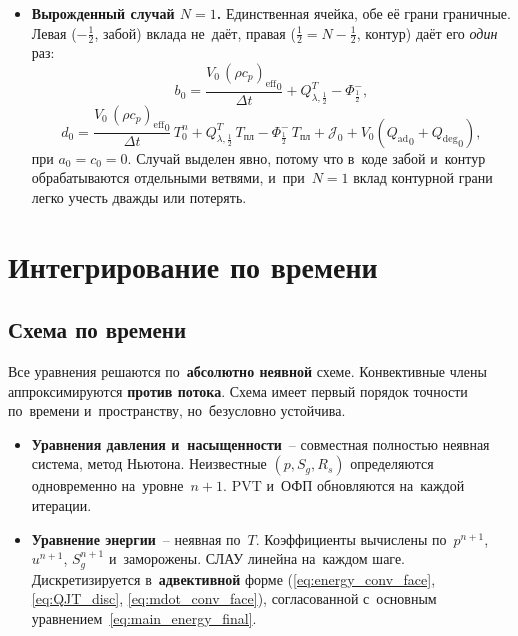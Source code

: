 \documentclass[12pt,a4paper]{article}
\newcommand{\half}{\tfrac{1}{2}}
\newcommand{\pwf}{p_{\mathrm{wf}}}
\newcommand{\Tpl}{T_{\text{пл}}}
\newcommand{\rhocpeff}{(\rho c_p)_{\mathrm{eff}}}
\newcommand{\Qad}{Q_{\mathrm{ad}}}
\newcommand{\Qdeg}{Q_{\mathrm{deg}}}
\begin{document}
\begin{itemize}[nosep]
    \textbf{Важно.} При \emph{втекании} через забой ($\Phi_{-\half}^{+} > 0$,
    то~есть $\pwf > p_0$) температура входящего потока не~задана
    ни~одним условием, и~формула выше её не~восполняет. Такой режим
    для~данной постановки не~определён и~должен запрещаться
    проверкой в~реализации.
  \item \textbf{Вырожденный случай $N = 1$.} Единственная ячейка,
    обе её грани граничные. Левая ($-\half$, забой) вклада не~даёт, правая
    ($\half = N-\half$, контур) даёт его \emph{один} раз:
    \[
      b_0 = \frac{V_0\,{\rhocpeff}_0}{\Delta t}
            + Q_{\lambda,\half}^T - \Phi_{\half}^{-},
      \]
      \[
      d_0 = \frac{V_0\,{\rhocpeff}_0}{\Delta t}\,T_0^n
            + Q_{\lambda,\half}^T\,\Tpl
            - \Phi_{\half}^{-}\,\Tpl
            + \mathcal{J}_0 + V_0({\Qad}_0 + {\Qdeg}_0),
    \]
    при $a_0 = c_0 = 0$. Случай выделен явно, потому что в~коде
    забой и~контур обрабатываются отдельными ветвями, и~при~$N = 1$
    вклад контурной грани легко учесть дважды или потерять.
\end{itemize}


\section{Интегрирование по времени}\label{sec:time}

\subsection{Схема по времени}\label{ssec:time_scheme}

Все уравнения решаются по~\textbf{абсолютно неявной} схеме.
Конвективные члены аппроксимируются \textbf{против потока}.
Схема имеет первый порядок точности по~времени
и~пространству, но~безусловно устойчива.

\begin{itemize}[nosep]
  \item \textbf{Уравнения давления и~насыщенности}~-- совместная
    полностью неявная система, метод Ньютона. Неизвестные
    $(p, S_g, R_s)$ определяются одновременно на~уровне~$n{+}1$.
    PVT и~ОФП обновляются на~каждой итерации.
  \item \textbf{Уравнение энергии}~-- неявная по~$T$. Коэффициенты
    вычислены по~$p^{n+1}$, $u^{n+1}$, $S_g^{n+1}$ и~заморожены.
    СЛАУ линейна на~каждом шаге. Дискретизируется
    в~\textbf{адвективной} форме (\eqref{eq:energy_conv_face},
    \eqref{eq:QJT_disc}, \eqref{eq:mdot_conv_face}), согласованной
    с~основным уравнением~\eqref{eq:main_energy_final}.
\end{itemize}
\end{document}
